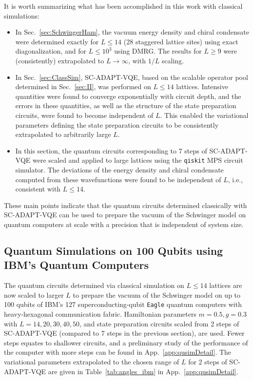 \documentclass[aps, pra, onecolumn, tightenlines, letterpaper, amsmath, amssymb, preprintnumbers, floatfix, longbibliography, nofootinbib]{revtex4-2}
\begin{document}
It is worth summarizing what has been accomplished 
in this work with classical simulations:
%
\begin{itemize}
    \item In Sec.~\ref{sec:SchwingerHam}, the vacuum energy density and chiral condensate were determined exactly for 
    $L\le 14$ (28 staggered lattice sites) using exact diagonalization, and for $L\le 10^3$ using DMRG.
    The results for $L\ge 9$ were (consistently) extrapolated to $L\rightarrow\infty$, with $1/L$ scaling.
    \item In Sec.~\ref{sec:ClassSim}, SC-ADAPT-VQE, based on the scalable operator pool determined in Sec.~\ref{sec:II}, was performed on $L\leq 14$ lattices.
    Intensive quantities were found to converge exponentially with circuit depth, and the errors in these quantities, as well as the structure of the state preparation circuits, were found to become independent of $L$.
    This enabled the variational parameters defining the state preparation circuits to be consistently extrapolated to arbitrarily large $L$.
    \item 
    In this section,
    the quantum circuits corresponding to 7 steps of SC-ADAPT-VQE were scaled and applied to large lattices using the {\tt qiskit} MPS circuit simulator.  
    The deviations of the energy density and chiral condensate computed from these wavefunctions were found to be independent of $L$, i.e., consistent with $L\le 14$.
\end{itemize}
%
These main points indicate that the quantum circuits determined classically with SC-ADAPT-VQE can be used to prepare the vacuum 
of the Schwinger model 
on quantum computers at scale with a precision that is independent of system size.


\subsection{Quantum Simulations on 100 Qubits using IBM's Quantum Computers}
\label{sec:SCQuSim}
\noindent
The quantum circuits determined via classical simulation on $L\le 14$ lattices  
are now scaled to larger $L$ to
prepare the vacuum of the Schwinger model 
on up to 100 qubits of 
IBM's 127 superconducting-qubit 
{\tt Eagle} quantum computers with heavy-hexagonal communication fabric.
Hamiltonian parameters $m=0.5, g=0.3$ with $L=14,20,30,40,50$,
and 
state preparation circuits scaled from 2 steps of SC-ADAPT-VQE 
(compared to 7 steps in the previous section), are used.
Fewer steps equates to shallower circuits, and a preliminary study of the performance of the computer with more steps can be found in App.~\ref{app:qusimDetail}.
The variational parameters extrapolated to the chosen range of $L$ for 2 steps of SC-ADAPT-VQE are given in 
Table~\ref{tab:angles_ibm} in
App.~\ref{app:qusimDetail}.
\end{document}
